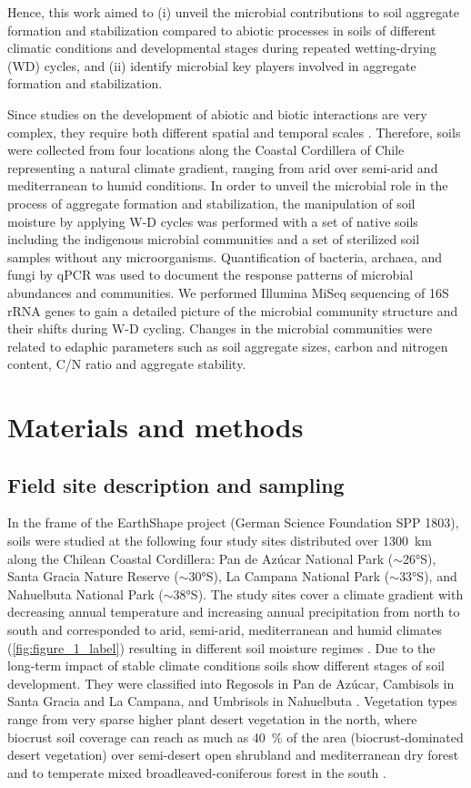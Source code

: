 Hence, this work aimed to (i) unveil the microbial contributions to soil aggregate formation and stabilization compared to abiotic processes in soils of different climatic conditions and developmental stages during repeated wetting-drying (WD) cycles, and (ii) identify microbial key players involved in aggregate formation and stabilization.

Since studies on the development of abiotic and biotic interactions are very complex, they require both different spatial and temporal scales \citep{Ollivier2011}. Therefore, soils were collected from four locations along the Coastal Cordillera of Chile representing a natural climate gradient, ranging from arid over semi-arid and mediterranean to humid conditions. In order to unveil the microbial role in the process of aggregate formation and stabilization, the manipulation of soil moisture by applying W-D cycles was performed with a set of native soils including the indigenous microbial communities and a set of sterilized soil samples without any microorganisms. Quantification of bacteria, archaea, and fungi by qPCR was used to document the response patterns of microbial abundances and communities. We performed Illumina MiSeq sequencing of 16S rRNA genes to gain a detailed picture of the microbial community structure and their shifts during W-D cycling. Changes in the microbial communities were related to edaphic parameters such as soil aggregate sizes, carbon and nitrogen content, C/N ratio and aggregate stability.

\section{Materials and methods}
\subsection{Field site description and sampling}

In the frame of the EarthShape project (German Science Foundation SPP 1803), soils were studied at the following four study sites distributed over \SI{1300}{\kilo\metre} along the Chilean Coastal Cordillera: Pan de Az{\'u}car National Park (\(\sim\)\ang{26}S), Santa Gracia Nature Reserve (\(\sim\)\ang{30}S), La Campana National Park (\(\sim\)\ang{33}S), and Nahuelbuta National Park (\(\sim\)\ang{38}S). 
The study sites cover a climate gradient with decreasing annual temperature and increasing annual precipitation from north to south and corresponded to arid, semi-arid, mediterranean and humid climates (\cref{fig:figure_1_label}) resulting in different soil moisture regimes \citep{Bernhard2018b}. 
Due to the long-term impact of stable climate conditions \citep{Ewing2006} soils show different stages of soil development. 
They were classified into Regosols in Pan de Az{\'u}car, Cambisols in Santa Gracia and La Campana, and Umbrisols in Nahuelbuta \citep{Bernhard2018b}. 
Vegetation types range from very sparse higher plant desert vegetation in the north, where biocrust soil coverage can reach as much as \SI{40}{\percent} of the area (biocrust-dominated desert vegetation) over semi-desert open shrubland and mediterranean dry forest and to temperate mixed broadleaved-coniferous forest in the south \citep{Bernhard2018a, Bernhard2018b}.

